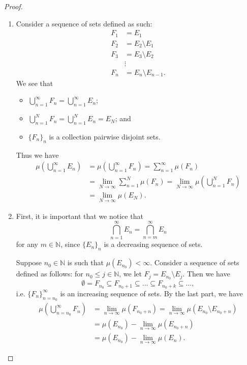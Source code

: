 \documentclass[notoc,notitlepage]{tufte-book}
\begin{document}
\begin{proof}
\begin{enumerate}
    \item Consider a sequence of sets defined as such:
      \begin{align*}
        F_1 &= E_1 \\
        F_2 &= E_2 \setminus E_1 \\
        F_3 &= E_3 \setminus E_2 \\
            &\vdots \\
        F_n &= E_n \setminus E_{n-1}.
      \end{align*}
      We see that
      \begin{itemize}
        \item $\bigcup_{n=1}^{\infty} F_n = \bigcup_{n=1}^{\infty} E_n$;
        \item $\bigcup_{n=1}^{N} F_n = \bigcup_{n=1}^{N} E_n = E_N$; and
        \item $\{ F_n \}_{n}$ is a collection pairwise disjoint sets.
      \end{itemize}
      Thus we have
      \begin{align*}
        \mu \left( \bigcup_{n=1}^{\infty} E_n \right)
        &= \mu \left( \bigcup_{n=1}^{\infty} F_n \right)
        = \sum_{n=1}^{\infty} \mu(F_n) \\
        &= \lim_{N \to \infty} \sum_{n=1}^{N} \mu(F_n)
        = \lim_{N \to \infty} \mu \left( \bigcup_{n=1}^{N} F_n \right) \\
        &= \lim_{N \to \infty} \mu(E_N).
      \end{align*}
    \item First, it is important that we notice that
      \begin{equation*}
        \bigcap_{n=1}^{\infty} E_n = \bigcap_{n=m}^{\infty} E_n
      \end{equation*}
      for any $m \in \mathbb{N}$, since $\{ E_n \}_{n}$ is a
      decreasing sequence of sets.

      Suppose $n_0 \in \mathbb{N}$ is such that $\mu(E_{n_0}) < \infty$.
      Consider a sequence of sets defined as follows:
      for $n_0 \leq j \in \mathbb{N}$, we let $F_j = E_{n_0} \setminus E_j$.
      Then we have
      \begin{equation*}
        \emptyset = F_{n_0} \subseteq F_{n_0 + 1} \subseteq \hdots \subseteq
        F_{n_0 + k} \subseteq \hdots,
      \end{equation*}
      i.e. $\{ F_n \}_{n=n_0}^{\infty}$ is an increasing sequence
      of sets.
      By the last part, we have
      \begin{align*}
        \mu \left( \bigcup_{n=n_0}^{\infty} F_n \right)
        &= \lim_{n \to \infty} \mu(F_{n_0 + n})
        = \lim_{n \to \infty} \mu(E_{n_0} \setminus E_{n_0 + n}) \\
        &= \mu(E_{n_0}) - \lim_{n \to \infty} \mu(E_{n_0 + n}) \\
        &= \mu(E_{n_0}) - \lim_{n \to \infty} \mu(E_n).
      \end{align*}


\end{enumerate}
\end{proof}
\end{document}
